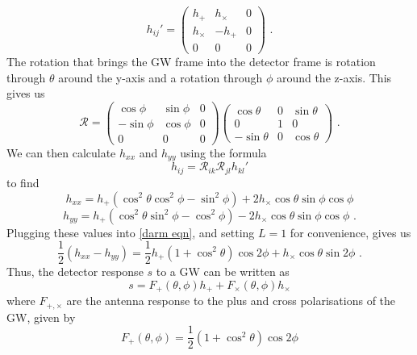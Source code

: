 \documentclass[11pt]{cuthesis}
\newcommand{\fs}{\text{ .}}
\begin{document}
\begin{equation}
h_{ij}'
=
\begin{pmatrix}
h_+ & h_\times & 0 \\
h_\times & -h_+ & 0 \\
0 & 0 & 0
\end{pmatrix} \fs
\end{equation}
The rotation that brings the GW frame into the detector frame is rotation through $\theta$ around the y-axis and a rotation through $\phi$ around the z-axis. This gives us
\begin{equation}
\mathcal{R}
=
\begin{pmatrix}
\cos \phi & \sin \phi & 0 \\
-\sin \phi & \cos \phi & 0 \\
0 & 0 & 0
\end{pmatrix}
\begin{pmatrix}
\cos \theta & 0 & \sin \theta \\
0 & 1 & 0 \\
-\sin \theta & 0 & \cos \theta
\end{pmatrix} \fs
\end{equation}
We can then calculate $h_{xx}$ and $h_{yy}$ using the formula
\begin{equation}
h_{ij} = \mathcal{R}_{ik} \mathcal{R}_{jl} h_{kl}'
\end{equation}
to find
\begin{equation}
h_{xx} = h_+(\cos^2 \theta \cos^2 \phi - \sin^2 \phi) + 2h_\times \cos \theta \sin\phi \cos\phi
\end{equation}
\begin{equation}
h_{yy} = h_+(\cos^2 \theta \sin^2 \phi - \cos^2 \phi) - 2h_\times \cos \theta \sin\phi \cos\phi \fs
\end{equation}
Plugging these values into \ref{darm eqn}, and setting $L=1$ for convenience, gives us
\begin{equation}
\frac{1}{2} (h_{xx} - h_{yy}) = \frac{1}{2} h_+ (1+\cos^2\theta)\cos 2\phi + h_\times \cos \theta \sin 2\phi \fs
\end{equation}
Thus, the detector response $s$ to a GW can be written as
\begin{equation}
s = F_+(\theta,\phi)h_+ + F_\times(\theta,\phi) h_\times
\end{equation}
where $F_{+,\times}$ are the antenna response to the plus and cross polarisations of the GW, given by
\begin{equation}
F_+(\theta,\phi) = \frac{1}{2} (1+\cos^2\theta)\cos 2\phi
\end{equation}
\end{document}
